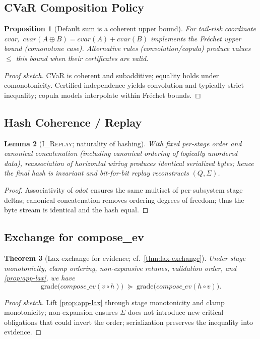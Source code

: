 \documentclass[11pt]{article}
\theoremstyle{plain}
\newtheorem{theorem}{Theorem}[section]
\newtheorem{lemma}[theorem]{Lemma}
\newtheorem{proposition}[theorem]{Proposition}
\theoremstyle{definition}
\theoremstyle{remark}
\def\Q{Q}%
\def\Sig{\Sigma}%
\def\composeev{compose\_ev}%
\def\hplus{odot}%
\def\code#1{#1}%
\DeclareRobustCommand{\Q}{\texorpdfstring{\ensuremath{\mathcal{Q}}}{Q}}     %
\DeclareRobustCommand{\Sig}{\texorpdfstring{\ensuremath{\Sigma}}{\Sigma}}   %
\DeclareMathOperator{\composeevOp}{compose\_ev}
\DeclareRobustCommand{\composeev}{\texorpdfstring{\ensuremath{\composeevOp}}{compose\_ev}}
\newcommand{\hplus}{\odot}                     %
\newcommand{\geqQ}{\succeq}
\newcommand{\code}[1]{\texttt{\textup{#1}}}    %
\newcommand{\cvar}{\code{cvar}}
\newcommand{\IReplay}{\textsc{I\_Replay}}
\def\Q{Q}%
\def\Sig{\Sigma}%
\def\composeev{compose\_ev}%
\def\hplus{odot}%
\def\code#1{#1}%
\begin{document}
\subsection{CVaR Composition Policy}
\begin{proposition}[Default sum is a coherent upper bound]
\label{prop:app-cvar}
For tail-risk coordinate \cvar, $\,\cvar(A\oplus B)=\cvar(A)+\cvar(B)$ implements the Fréchet upper bound (comonotone case). Alternative rules (convolution/copula) produce values $\le$ this bound when their certificates are valid.
\end{proposition}
\begin{proof}[Proof sketch]
CVaR is coherent and subadditive; equality holds under comonotonicity. Certified independence yields convolution and typically strict inequality; copula models interpolate within Fréchet bounds.
\end{proof}

\subsection{Hash Coherence / Replay}
\begin{lemma}[\IReplay; naturality of hashing]
\label{lem:app-replay}
With fixed per-stage order and canonical concatenation (including canonical ordering of logically unordered data), reassociation of horizontal wiring produces identical serialized bytes; hence the final hash is invariant and bit-for-bit replay reconstructs $(\Q,\Sig)$.
\end{lemma}
\begin{proof}
Associativity of $\hplus$ ensures the same multiset of per-subsystem stage deltas; canonical concatenation removes ordering degrees of freedom; thus the byte stream is identical and the hash equal.
\end{proof}

\subsection{Exchange for \composeev}
\begin{theorem}[Lax exchange for evidence; cf.\ \cref{thm:lax-exchange}]
\label{thm:app-exchange}
Under stage monotonicity, clamp ordering, non-expansive retunes, validation order, and \cref{prop:app-lax}, we have
\[
  \mathrm{grade}\big(\composeev(v\circ h)\big)\;\geqQ\;
  \mathrm{grade}\big(\composeev(h\circ v)\big).
\]
\end{theorem}
\begin{proof}[Proof sketch]
Lift \cref{prop:app-lax} through stage monotonicity and clamp monotonicity; non-expansion ensures $\Sig$ does not introduce new critical obligations that could invert the order; serialization preserves the inequality into evidence.
\end{proof}

\end{document}
